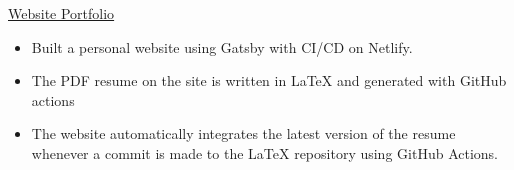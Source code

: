 
\href{https://rsun.dev}{Website Portfolio}
\begin{itemize}
    \item Built a personal website using Gatsby with CI/CD on Netlify.
    \item The PDF resume on the site is written in \LaTeX{} and generated with GitHub actions
    \item The website automatically integrates the latest version of the resume whenever a commit is made to the \LaTeX{} repository using GitHub Actions.
\end{itemize}
